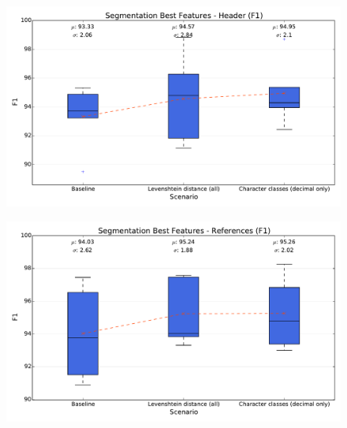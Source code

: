 \begin{figure}[h]
\center
\includegraphics[width=5.5in]{Figures/header.pdf}
\caption{}
\label{fig:header}
\end{figure}

\begin{figure}[h]
\center
\includegraphics[width=5.5in]{Figures/references.pdf}
\caption{}
\label{fig:references}
\end{figure}

